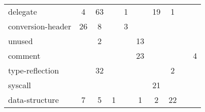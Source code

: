 \begin{table}[h]
\begin{tabularx}{\textwidth}{Xccccccccc}
        \rowcolor{verylightgray}
        delegate &          4 &       63 &                &             1 &        &         19 &             1 &                        &               \\
        conversion-header &         26 &        8 &                &             3 &        &            &               &                        &               \\
        \rowcolor{verylightgray}
        unused &            &        2 &                &               &     13 &            &               &                        &               \\
        comment &            &          &                &               &     23 &            &               &                        &             4 \\
        \rowcolor{verylightgray}
        type-reflection &            &       32 &                &               &        &            &             2 &                        &               \\
        syscall &            &          &                &               &        &         21 &               &                        &               \\
        \rowcolor{verylightgray}
        data-structure &          7 &        5 &              1 &               &      1 &          2 &            22 &                        &               \\
        \bottomrule
    \end{tabularx}
\end{table}

